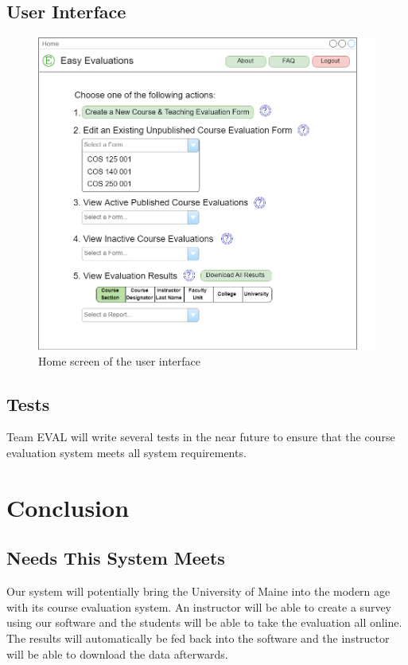 \documentclass{article}
\begin{document}
\subsection{User Interface}

\begin{center}
\begin{figure}[H]
    \centering
    \caption{Home screen of the user interface}
    \includegraphics[width=6.5in]{images/home_screen.png}
\end{figure}
\end{center}

\subsection{Tests}

Team EVAL will write several tests in the near future to ensure that the course evaluation system meets all system requirements.

\section{Conclusion}

\subsection{Needs This System Meets}
Our system will potentially bring the University of Maine into the modern age with its course evaluation system. An instructor will be able to create a survey using our software and the students will be able to take the evaluation all online. The results will automatically be fed back into the software and the instructor will be able to download the data afterwards.
\end{document}

